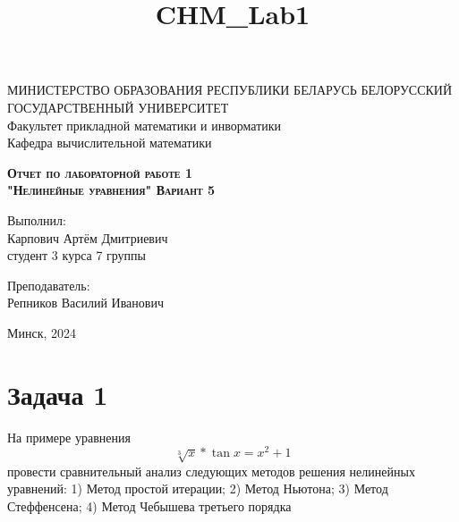 \documentclass[11pt]{article}
\title{CHM\_Lab1}
\begin{document}
    
    \begin{titlepage}
    \newpage
    
    \begin{center}
    МИНИСТЕРСТВО ОБРАЗОВАНИЯ РЕСПУБЛИКИ БЕЛАРУСЬ БЕЛОРУССКИЙ ГОСУДАРСТВЕННЫЙ УНИВЕРСИТЕТ \\
    Факультет прикладной математики и инворматики \\ Кафедра вычислительной математики
 
    \end{center}
    
    \vspace{8em}
    
    \vspace{2em}
    
    \begin{center}
    \textsc{\textbf{Отчет по лабораторной работе 1 \\ "Нелинейные уравнения" \linebreak Вариант 5}}
    \end{center}
    
    \vspace{6em}
    
    \begin{flushright}
        Выполнил:\\
        Карпович Артём Дмитриевич\\
        студент 3 курса 7 группы
    \end{flushright}
    
    \begin{flushright}
        Преподаватель:\\
        Репников Василий Иванович
    \end{flushright}
    
    \vspace{\fill}
    
    \vspace{\fill}
    
    \begin{center}
    Минск, 2024
    \end{center}
    
    \end{titlepage}


    \section*{Задача 1}

На примере уравнения
\[{\sqrt[3]{x}*\tan{x}=x^2+1}\]
провести сравнительный анализ следующих методов решения нелинейных
уравнений: 1) Метод простой итерации; 2) Метод Ньютона; 3) Метод
Стеффенсена; 4) Метод Чебышева третьего порядка
\end{document}
